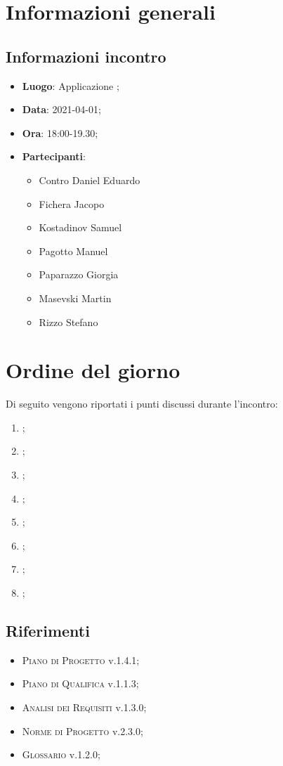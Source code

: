 \documentclass{article}
\begin{document}


\section{Informazioni generali}
\label{sec:info_generali}

\subsection{Informazioni incontro}
\label{sub:info_incontro}

\begin{itemize}
	\item \textbf{Luogo}: Applicazione ;
	\item \textbf{Data}: 2021-04-01;
	\item \textbf{Ora}: 18:00-19.30;
	\item \textbf{Partecipanti}:
	\begin{itemize}
		\item Contro Daniel Eduardo
		\item Fichera Jacopo
		\item Kostadinov Samuel
		\item Pagotto Manuel
		\item Paparazzo Giorgia
		\item Masevski Martin
		\item Rizzo Stefano
	\end{itemize}
\end{itemize}

\section{Ordine del giorno}%
\label{sec:ordine_del_giorno}
Di seguito vengono riportati i punti discussi durante l'incontro:
\begin{enumerate}
	\item {};
	\item {};
	\item {};
	\item {};
	\item {};
    \item {};
    \item {};
    \item {};
\end{enumerate}


\subsection{Riferimenti}%
\label{sub:riferimenti}
\begin{itemize}
    \item \textsc{Piano di Progetto} v.1.4.1;
    \item \textsc{Piano di Qualifica} v.1.1.3;
    \item \textsc{Analisi dei Requisiti} v.1.3.0;
    \item \textsc{Norme di Progetto} v.2.3.0;
    \item \textsc{Glossario} v.1.2.0;
    \end{itemize}
\end{document}
